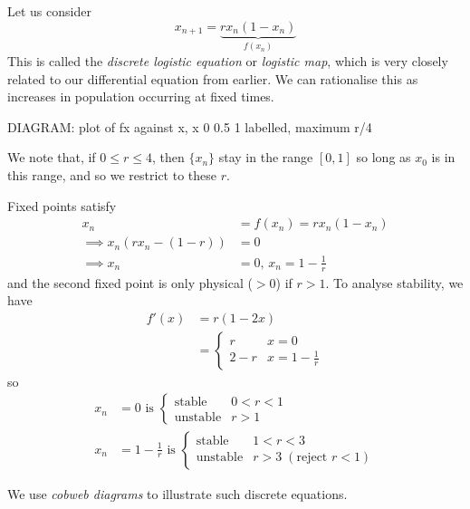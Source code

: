 \documentclass{../template/note}
\begin{document}
    \begin{example}
        Let us consider
        \[
            x_{n+1} = \underbrace{rx_n(1-x_n)}_{f(x_n)}
        \]
        This is called the \emph{discrete logistic equation} or \emph{logistic map}, which is very closely related to our differential equation from earlier. We can rationalise this as increases in population occurring at fixed times.

        DIAGRAM: plot of fx against x, x 0 0.5 1 labelled, maximum r/4

        We note that, if \(0 \leq r \leq 4\), then \(\{x_n\}\) stay in the range \([0, 1]\) so long as \(x_0\) is in this range, and so we restrict to these \(r\).

        Fixed points satisfy
        \begin{align*}
            x_n &= f(x_n) = rx_n(1-x_n) \\
            \implies x_n(rx_n - (1-r)) &= 0 \\
            \implies x_n &= 0, \, x_n = 1 - \frac{1}{r}
        \end{align*}
        and the second fixed point is only physical (\(> 0\)) if \(r > 1\). To analyse stability, we have
        \begin{align*}
            f'(x) &= r(1-2x) \\
            &= \begin{cases}
                r & x = 0 \\
                2 - r & x = 1 - \frac{1}{r}
            \end{cases}
        \end{align*}
        so
        \begin{align*}
            x_n &= 0 \text{ is } \begin{cases}
                \text{stable} & 0 < r < 1 \\
                \text{unstable} & r > 1
            \end{cases} \\
            x_n &= 1 - \frac{1}{r} \text{ is } \begin{cases}
                \text{stable} & 1 < r < 3 \\
                \text{unstable} & r > 3 \; (\text{reject } r < 1)
            \end{cases}
        \end{align*}
    \end{example}

    We use \emph{cobweb diagrams} to illustrate such discrete equations.
    
\end{document}
